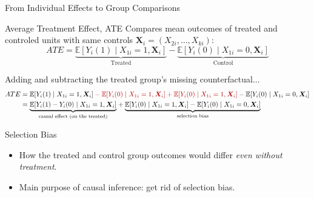 \documentclass[9pt,aspectratio=169]{beamer}
\newcommand{\E}{\mathbb{E}}
\begin{document}
\begin{frame}{From Individual Effects to Group Comparisons}
\linespread{1.2}\selectfont
  \begin{block}{Average Treatment Effect, ATE}
    Compares mean outcomes of treated and controled units with same controls $\boldsymbol{X}_i = (X_{2i},\dots,X_{ki})$:
  \[
    ATE =
    \underbrace{\E[Y_i(1)\mid X_{1i}=1, \boldsymbol{X}_i]}_{\text{Treated}} - \underbrace{\E[Y_i(0)\mid X_{1i}=0, \boldsymbol{X}_i]}_{\text{Control}}
  \]
  \end{block}
  Adding and subtracting the treated group's \textcolor{red!70!black}{missing counterfactual}...
  \begin{align*}
    ATE&= \E[Y_i(1)\mid X_{1i}=1, \boldsymbol{X}_i] \textcolor{red!70!black}{{}- \E[Y_i(0)\mid X_{1i}=1, \boldsymbol{X}_i] + \E[Y_i(0)\mid X_{1i}=1, \boldsymbol{X}_i]{}}
    - \E[Y_i(0)\mid X_{1i}=0, \boldsymbol{X}_i]\\
    &= {\underbrace{\E[Y_i(1)-Y_i(0)\mid X_{1i}=1, \boldsymbol{X}_i]}_{\text{causal effect (on the treated)}}} +\underbrace{\E[Y_i(0)\mid X_{1i}=1, \boldsymbol{X}_i]-\E[Y_i(0)\mid X_{1i}=0, \boldsymbol{X}_i]}_{\text{selection bias}}
  \end{align*}
  \vspace{-0.2cm}
  \begin{block}{Selection Bias}
    \begin{itemize}
      \item How the treated and control group outcomes would differ \emph{even without treatment}.
      \item[$\rightarrow$] Main purpose of causal inference: get rid of selection bias. 
    \end{itemize}
  \end{block}
\end{frame}
\end{document}
